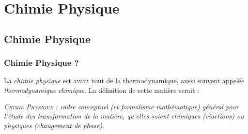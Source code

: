 \documentclass[11pt, a4paper, openany]{book}
\begin{document}
	\part{Chimie Physique}
	\chapter{Chimie Physique}
	\section*{Chimie Physique ?}
	La \textit{chimie physique} est avant tout de la thermodynamique, aussi souvent appelée \textit{thermodynamique chimique}. La définition de cette matière serait :
	\begin{center}
		\textit{\textsc{Chimie Physique} : cadre conceptuel (et formalisme mathématique) général pour l'étude des transformation de la matière, qu'elles soient chimiques (réactions) ou physiques (changement de phase).} \end{center}
		
\end{document}
